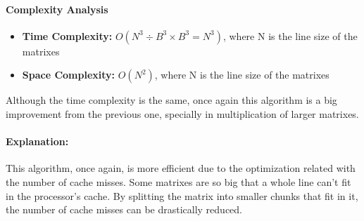 \paragraph{Complexity Analysis}
\begin{itemize}
    \item \textbf{Time Complexity:} $O(N^3 \div B^3 \times B^3 = N^3)$, where N is the line size of the matrixes
    \item \textbf{Space Complexity:} $O(N^2)$, where N is the line size of the matrixes
\end{itemize}

Although the time complexity is the same, once again this algorithm is a big improvement from the previous one, specially in multiplication of larger matrixes.

\paragraph{Explanation:} This algorithm, once again, is more efficient due to the optimization related with the number of cache misses. Some matrixes are so big that a whole line can't fit in the processor's cache. By splitting the matrix into smaller chunks that fit in it, the number of cache misses can be drastically reduced.

